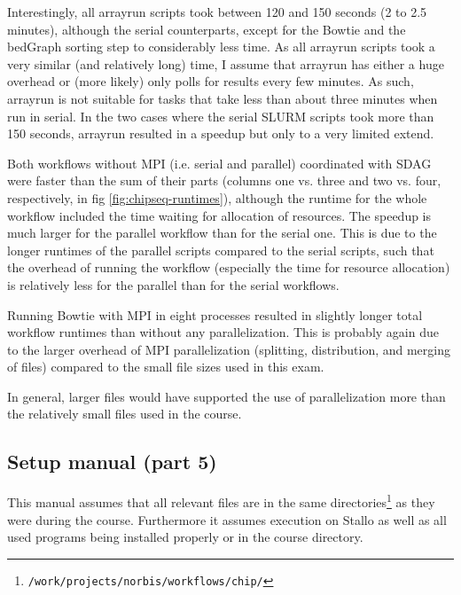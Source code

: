 \documentclass[paper=a4, 12pt]{scrartcl}
\begin{document}
Interestingly, all arrayrun scripts took between 120 and 150 seconds (2 to 2.5 minutes), although the serial counterparts, except for the Bowtie and the bedGraph sorting step to considerably less time. As all arrayrun scripts took a very similar (and relatively long) time, I assume that arrayrun has either a huge overhead or (more likely) only polls for results every few minutes. As such, arrayrun is not suitable for tasks that take less than about three minutes when run in serial. In the two cases where the serial SLURM scripts took more than 150 seconds, arrayrun resulted in a speedup but only to a very limited extend.

Both workflows without MPI (i.e. serial and parallel) coordinated with SDAG were faster than the sum of their parts (columns one vs. three and two vs. four, respectively, in fig \ref{fig:chipseq-runtimes}), although the runtime for the whole workflow included the time waiting for allocation of resources. The speedup is much larger for the parallel workflow than for the serial one. This is due to the longer runtimes of the parallel scripts compared to the serial scripts, such that the overhead of running the workflow (especially the time for resource allocation) is relatively less for the parallel than for the serial workflows.

Running Bowtie with MPI in eight processes resulted in slightly longer total workflow runtimes than without any parallelization. This is probably again due to the larger overhead of MPI parallelization (splitting, distribution, and merging of files) compared to the small file sizes used in this exam.

In general, larger files would have supported the use of parallelization more than the relatively small files used in the course.

\subsection{Setup manual (part 5)}

This manual assumes that all relevant files are in the same directories\footnote{\texttt{/work/}\allowbreak\texttt{projects/}\texttt{norbis/}\allowbreak\texttt{workflows/}\allowbreak\texttt{chip/}} as they were during the course. Furthermore it assumes execution on Stallo as well as all used programs being installed properly or in the course directory.
\end{document}
